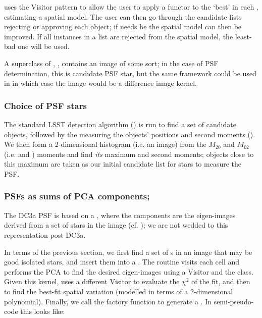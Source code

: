  uses the Visitor pattern \citep{GoF} to allow the user to apply a functor to the `best'
 in each , estimating a spatial model.  The user can then go through the
candidate lists rejecting or approving each object; if needs be the spatial model can then be improved.  If all
instances in a list are rejected from the spatial model, the least-bad one will be used.

A superclass of , , contains an image
of some sort; in the case of PSF determination, this is candidate PSF star, but the
same framework could be used in  in which case the image would
be a difference image kernel.

\subsubsection{Choice of PSF stars}
\label{secChoosePSFStars}

The standard LSST detection algorithm () is run to find a set
of candidate objects, followed by the measuring the objects' positions and
second moments ().  We then form a 2-dimensional
histogram (i.e. an image) from the $M_{20}$ and $M_{02}$ (i.e.  and ) moments
and find \textit{its} maximum and second moments;  objects close to this maximum
are taken as our initial candidate list for stars to measure the PSF.

\subsubsection{PSFs as sums of PCA components; }

The DC3a PSF is based on a , where
the components are the eigen-images derived from a set of stars in the image (cf. \citet{photoADASS});
we are not wedded to this representation post-DC3a.

In terms of the previous section,  we first find a set of s in an image
that may be good isolated stars,  and insert them into a .  The
routine  visits each cell and performs the PCA
to find the desired eigen-images using a Visitor and the  class.
Given this kernel,  uses a different
Visitor to evaluate the $\chi^2$ of the fit, and then  to find
the best-fit spatial variation (modelled in terms of a 2-dimensional polynomial).  Finally,
we call the  factory function to generate a .
In semi-pseudo-code this looks like:

